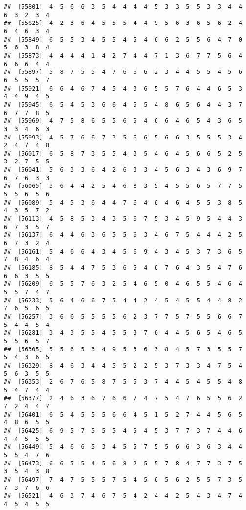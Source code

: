 \documentclass[
]{book}
\begin{document}
\begin{verbatim}
##  [55801]  4  5  6  6  3  5  4  4  4  4  5  3  3  5  5  3  3  4  4  6  3  2  3  4
##  [55825]  4  2  3  6  4  5  5  5  4  4  9  5  6  3  6  5  6  2  4  6  4  6  3  4
##  [55849]  6  5  5  3  4  5  5  4  5  4  6  6  2  5  5  6  4  7  0  5  6  3  8  4
##  [55873]  4  4  4  4  1  4  2  7  4  4  7  1  3  6  7  7  5  6  4  6  6  6  4  4
##  [55897]  5  8  7  5  5  4  7  6  6  6  2  3  4  4  5  5  4  5  6  6  5  5  5  7
##  [55921]  6  6  4  6  7  4  5  4  3  6  5  5  7  6  4  4  6  5  3  4  4  9  4  5
##  [55945]  6  5  4  5  3  6  6  4  5  5  4  8  6  5  6  4  4  3  7  6  7  7  8  5
##  [55969]  4  7  5  8  6  5  5  6  5  4  6  6  4  6  5  4  3  6  5  3  3  4  6  3
##  [55993]  4  5  7  6  6  7  3  5  6  6  5  6  6  3  5  5  5  3  4  2  4  7  4  8
##  [56017]  6  5  8  7  3  5  5  4  3  5  4  6  4  5  6  6  5  2  5  3  2  7  5  5
##  [56041]  5  6  3  3  6  4  2  6  3  3  4  5  6  3  4  3  6  9  7  6  7  6  3  3
##  [56065]  3  6  4  4  2  5  4  6  8  3  5  4  5  5  6  5  7  7  5  5  5  6  5  6
##  [56089]  5  4  5  3  6  4  4  7  6  4  6  4  6  4  5  5  3  8  5  4  3  5  7  2
##  [56113]  4  5  8  5  3  4  3  5  6  7  5  3  4  5  9  5  4  4  3  6  7  3  5  7
##  [56137]  6  4  4  6  3  6  5  5  6  3  4  6  7  5  4  4  4  2  5  6  7  3  2  4
##  [56161]  5  4  6  6  4  3  4  5  6  9  4  3  4  5  3  7  3  6  5  7  8  4  6  4
##  [56185]  8  5  4  4  7  5  3  6  5  4  6  7  6  4  3  5  4  7  6  6  6  3  5  5
##  [56209]  6  5  5  7  6  3  2  5  4  6  5  0  4  6  5  5  4  6  4  5  5  7  4  7
##  [56233]  5  6  4  6  6  7  5  4  4  2  4  5  4  5  5  4  4  8  2  7  6  5  6  5
##  [56257]  3  6  6  5  5  5  5  6  2  3  7  7  5  7  5  5  6  6  7  5  4  4  5  4
##  [56281]  3  4  3  5  5  4  5  5  3  7  6  4  4  5  6  5  4  6  5  5  5  6  5  7
##  [56305]  5  5  6  5  3  4  9  5  3  6  3  8  4  5  7  3  5  5  7  5  4  3  6  5
##  [56329]  8  4  6  3  4  4  5  5  2  2  5  3  7  3  3  4  7  5  4  5  6  3  5  5
##  [56353]  2  6  7  6  5  8  7  5  5  3  7  4  4  5  4  5  5  4  8  5  4  7  4  4
##  [56377]  2  4  6  3  6  7  6  6  7  4  7  5  4  7  6  5  5  6  2  7  2  4  4  7
##  [56401]  6  5  4  5  5  5  6  6  4  5  1  5  2  7  4  4  5  6  5  4  8  6  5  5
##  [56425]  6  9  5  7  5  5  5  4  5  4  5  3  7  7  3  7  4  4  6  4  4  5  5  5
##  [56449]  5  4  6  6  5  3  4  5  5  7  5  5  6  6  3  6  3  4  4  5  5  4  7  6
##  [56473]  6  6  5  5  4  5  6  8  2  5  5  7  8  4  7  7  3  7  5  3  5  4  3  8
##  [56497]  7  4  7  5  5  5  7  5  4  5  6  5  6  2  5  5  7  3  5  7  3  7  6  6
##  [56521]  4  6  3  7  4  6  7  5  4  2  4  4  2  5  4  3  4  7  4  4  5  4  5  5

\end{verbatim}
\end{document}
